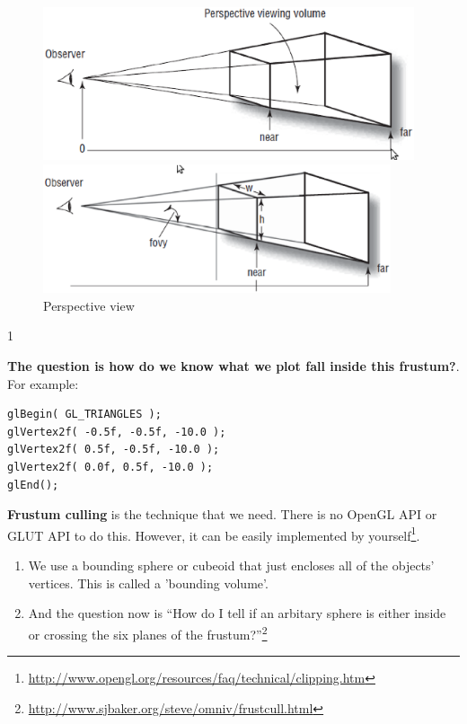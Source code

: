 \begin{figure}[hbt]
  \centerline{ \includegraphics[height=4.5cm,
    angle=0]{./images/perspective_projection_2.eps}}
  \centerline{\includegraphics[height=3.8cm,
    angle=0]{./images/perspective_projection_3.eps}}
\caption{Perspective view}
\label{fig:perspective_2}
\end{figure}1

{\bf The question is how do we know what we plot fall inside this
  frustum?}. For example:
\begin{verbatim}
glBegin( GL_TRIANGLES );
glVertex2f( -0.5f, -0.5f, -10.0 );
glVertex2f( 0.5f, -0.5f, -10.0 );
glVertex2f( 0.0f, 0.5f, -10.0 );
glEnd();
\end{verbatim}
{\bf Frustum culling} is the technique that we need. There is no
OpenGL API or GLUT API to do this. However, it can be easily
implemented by
yourself\footnote{\url{http://www.opengl.org/resources/faq/technical/clipping.htm}}. 
\begin{enumerate}
\item We use a bounding sphere or cubeoid that just encloses all of
  the objects' vertices. This is called a 'bounding volume'.
\item And the question now is ``How do I tell if an arbitary sphere is
  either inside or crossing the six planes of the
  frustum?''\footnote{\url{http://www.sjbaker.org/steve/omniv/frustcull.html}} 
\end{enumerate}

